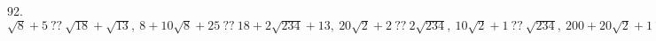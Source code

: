 92. $\sqrt{8}+5\ ??\ \sqrt{18}+\sqrt{13},\ 8+10\sqrt{8}+25\ ??\ 18+2\sqrt{234}+13,\ 20\sqrt{2}+2\ ??\ 2\sqrt{234},\ 10\sqrt{2}+1\ ??\ \sqrt{234},\ 200+20\sqrt{2}+1\ ??\ 234,\ 20\sqrt{2}\ ??\ 33,\ 800<1089.$\\
